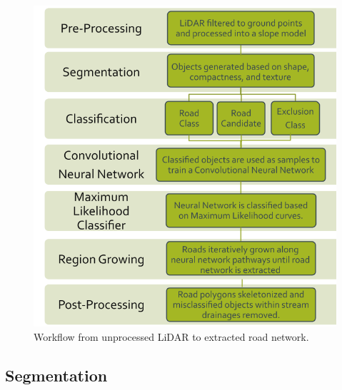 \documentclass[remotesensing,article,submit,pdftex,moreauthors]{Definitions/mdpi}
\begin{document}
\begin{figure}[H]
\includegraphics[width=10.5 cm]{workflow.png}
\caption{Workflow from unprocessed LiDAR to extracted road network. \label{fig3}}
\end{figure}    

\subsection{Segmentation}
\end{document}
